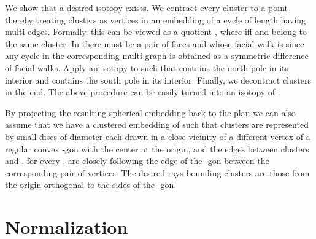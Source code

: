 \documentclass{llncs}
\begin{document}
We show that a desired isotopy exists. We contract every cluster to a point thereby
treating clusters as vertices in an embedding  of a cycle  of length  having multi-edges. 
Formally, this can be viewed as a quotient , where  iff
 and  belong to the same cluster.
In  there must be a pair of faces  and  whose facial walk is  since any cycle in the corresponding multi-graph is obtained as a symmetric difference of facial walks. Apply an isotopy to  such that  contains
the north pole in its interior and  contains the south pole in its interior. Finally, we decontract clusters in the end. The above procedure can be easily turned into an isotopy of . 

By projecting the resulting spherical embedding back to the plan we can also assume that we have a clustered embedding of 
such that clusters are represented by small discs of diameter  each drawn in a close vicinity
of a different vertex of a regular convex -gon with the center at the origin, and the edges
between clusters  and , for every , are closely following the edge
of the -gon between the corresponding pair of vertices. 
The desired rays bounding clusters are those from the origin orthogonal to the sides of the -gon. \\


\section*{Normalization}
\end{document}
